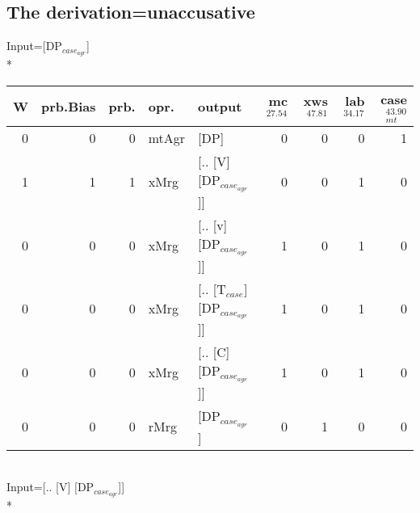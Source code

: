 \subsection{The derivation=unaccusative}
\begingroup\scriptsize Input=[DP$_{case_{agr}}$]\\*
\begin{tabularx}{\linewidth}{rrrlXrrrr}
\hline
   W &   prb.Bias &   prb. & opr.    & output                      &   mc$^{27.54}$ &   xws$^{47.81}$ &   lab$^{34.17}$ &   case$_{mt}^{43.90}$ \\
\hline
   0 &       0 &   0 & mtAgr & [DP]                        &            0 &             0 &             0 &                 1 \\
   1 &       1 &   1 & xMrg  & [.. [V] [DP$_{case_{agr}}$]]      &            0 &             0 &             1 &                 0 \\
   0 &       0 &   0 & xMrg  & [.. [v] [DP$_{case_{agr}}$]]      &            1 &             0 &             1 &                 0 \\
   0 &       0 &   0 & xMrg  & [.. [T$_{case}$] [DP$_{case_{agr}}$]] &            1 &             0 &             1 &                 0 \\
   0 &       0 &   0 & xMrg  & [.. [C] [DP$_{case_{agr}}$]]      &            1 &             0 &             1 &                 0 \\
   0 &       0 &   0 & rMrg  & [DP$_{case_{agr}}$]               &            0 &             1 &             0 &                 0 \\
\hline
\end{tabularx}\endgroup\\
\begingroup\scriptsize Input=[.. [V] [DP$_{case_{agr}}$]]\\*
